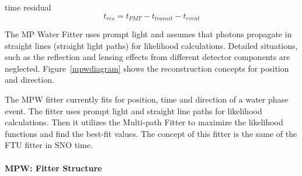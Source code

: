 time residual
\[
t_{res}=t_{PMT} - t_{transit} - t_{event} 
\]


The MP Water Fitter uses prompt light and assumes that photons propagate in straight lines (straight light paths) for likelihood calculations. Detailed situations, such as the reflection and lensing effects from different detector components are neglected. Figure~\ref{mpwdiagram} shows the reconstruction concepts for position and direction.


The MPW fitter currently fits for position, time and direction of a water phase event. The fitter uses prompt light and straight line paths for likelihood calculations. Then it utilizes the Multi-path Fitter to maximize the likelihood functions and find the best-fit values. The concept of this fitter is the same of the FTU fitter in SNO time.

\paragraph{MPW: Fitter Structure}

